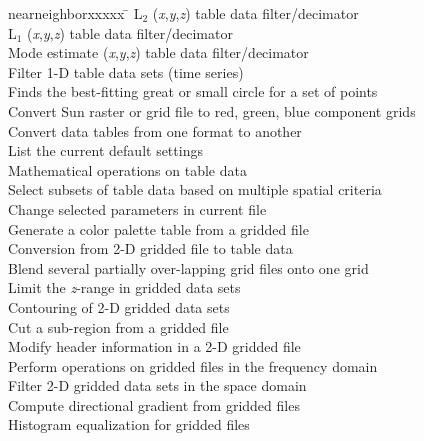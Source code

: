 \begin{tabbing}
nearneighborxxxxx \=					\kill
{}	\>	L$_2$ ({\it x},{\it y},{\it z}) table data filter/decimator \\ 
	\>	L$_1$ ({\it x},{\it y},{\it z}) table data filter/decimator \\ 
	\>	Mode estimate ({\it x},{\it y},{\it z}) table data filter/decimator \\ 
	\>	Filter 1-D table data sets (time series) \\ 
	\>	Finds the best-fitting great or small circle for a set of points \\ 
	\>	Convert Sun raster or grid file to red, green, blue component grids \\ 
	\>	Convert data tables from one format to another \\ 
	\>	List the current default settings \\ 
	\>	Mathematical operations on table data \\ 
	\>	Select subsets of table data based on multiple spatial criteria \\ 
	\>	Change selected parameters in current  file \\ 
	\>	Generate a color palette table from a gridded file \\ 
	\>	Conversion from 2-D gridded file to table data \\ 
	\>	Blend several partially over-lapping grid files onto one grid \\ 
	\>	Limit the {\it z}-range in gridded data sets \\ 
	\>	Contouring of 2-D gridded data sets \\ 
	\>	Cut a sub-region from a gridded file \\ 
	\>	Modify header information in a 2-D gridded file \\ 
	\>	Perform operations on gridded files in the frequency domain \\ 
	\>	Filter 2-D gridded data sets in the space domain \\ 
	\>	Compute directional gradient from gridded files \\ 
	\>	Histogram equalization for gridded files \\ 

\end{tabbing}
